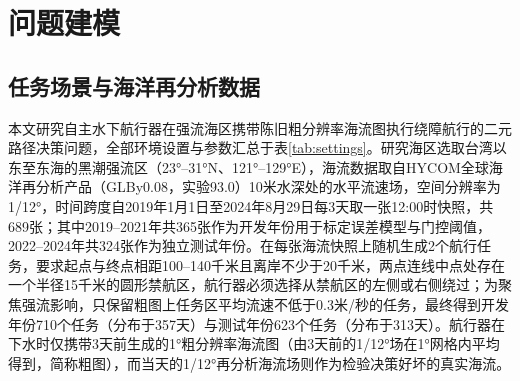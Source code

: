 \section{问题建模}

\subsection{任务场景与海洋再分析数据}
本文研究自主水下航行器在强流海区携带陈旧粗分辨率海流图执行绕障航行的二元路径决策问题，全部环境设置与参数汇总于表\ref{tab:settings}。研究海区选取台湾以东至东海的黑潮强流区（23°--31°N、121°--129°E），海流数据取自HYCOM全球海洋再分析产品（GLBy0.08，实验93.0\cite{chassignet2007hycom}）10米水深处的水平流速场，空间分辨率为1/12°，时间跨度自2019年1月1日至2024年8月29日每3天取一张12:00时快照，共689张；其中2019--2021年共365张作为开发年份用于标定误差模型与门控阈值，2022--2024年共324张作为独立测试年份。在每张海流快照上随机生成2个航行任务，要求起点与终点相距100--140千米且离岸不少于20千米，两点连线中点处存在一个半径15千米的圆形禁航区，航行器必须选择从禁航区的左侧或右侧绕过；为聚焦强流影响，只保留粗图上任务区平均流速不低于0.3米/秒的任务，最终得到开发年份710个任务（分布于357天）与测试年份623个任务（分布于313天）。航行器在下水时仅携带3天前生成的1°粗分辨率海流图（由3天前的1/12°场在1°网格内平均得到，简称粗图），而当天的1/12°再分析海流场则作为检验决策好坏的真实海流。

\begin{table}[htbp]
\centering
\caption{粗分辨率海流图下自主水下航行器航路决策问题的实验设置与参数。}
\label{tab:settings}
\small

\end{table}

